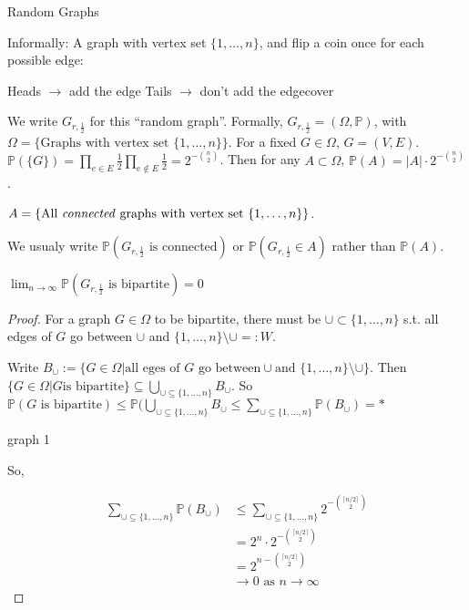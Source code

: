 \documentclass{article}
\begin{document}
\begin{examp}
Random Graphs

Informally: A graph with vertex set $\{1, \ldots, n\}$, and flip a coin once for each possible edge:

Heads $\rightarrow$ add the edge
Tails $\rightarrow$ don't add the edgecover

We write $G_{r,\frac{1}{2}}$ for this ``random graph''.  Formally, $G_{r,\frac{1}{2}} = (\Omega, \mathbb{P})$, with $\Omega = \{ \text{Graphs with vertex set } \{1, \ldots, n\} \}$.  For a fixed $G \in \Omega$, $G=(V,E)$.  $\mathbb{P}(\{G\}) = \displaystyle \prod_{e \in E} \frac{1}{2} \prod_{e \notin E} \frac{1}{2} = 2^{- {n \choose 2}}$.  Then for any $A \subset \Omega$, $\mathbb{P}(A) = |A| \cdot 2^{- {n \choose 2}}$.

\begin{examp}
$A = \{ \text{All \emph{connected} graphs with vertex set }\{1, \ldots, n\} \}$.

We usualy write $\mathbb{P}(G_{r, \frac{1}{2}} \text{ is connected} )$ or $\mathbb{P}(G_{r, \frac{1}{2}} \in A)$ rather than $\mathbb{P}(A)$.
\end{examp}
\end{examp}

\begin{prop}
$\lim_{n \rightarrow \infty} \mathbb{P}(G_{r, \frac{1}{2}} \text{ is bipartite} )=0$
\end{prop}

\begin{proof}
For a graph $G \in \Omega$ to be bipartite, there must be $\cup \subset \{1, \ldots, n \}$ s.t. all edges of $G$ go between $\cup$ and $\{1, \ldots, n\} \setminus \cup =: W$.

Write $B_{\cup} := \{ G \in \Omega | \text{all eges of }G \text{ go between} \cup \text{and } \{1, \ldots, n\} \setminus \cup \}$.  Then $\{ G \in \Omega | G \text{is bipartite} \} \subseteq \displaystyle \bigcup_{\cup \subseteq \{1, \ldots, n \}} B_{\cup}$.  So $ \displaystyle \mathbb{P}(G \text{ is bipartite}) \le \mathbb{P}(\bigcup_{\cup \subseteq \{1, \ldots, n \}} B_{\cup} \le \sum_{\cup \subseteq \{1, \ldots, n \}} \mathbb{P}(B_\cup) = *$ 

graph 1 

So, 

\begin{align*}
\sum_{\cup \subseteq \{1, \ldots, n \}} \mathbb{P}(B_\cup) & \le \sum_{\cup \subseteq \{1, \ldots, n \}} 2^{- {    { \lceil n/2 \rceil } \choose 2} } \\
&= 2^n \cdot 2^{- {    { \lceil n/2 \rceil } \choose 2} } \\
&= 2^{n - {    { \lceil n/2 \rceil } \choose 2} } \\
& \rightarrow 0 \text{ as } n \rightarrow \infty
\end{align*}
\end{proof}
\end{document}
